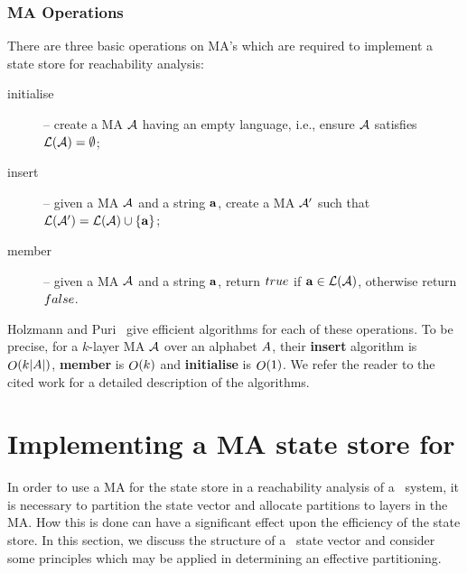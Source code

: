 \subsubsection{MA Operations}
There are three basic operations on MA's which are required to implement 
a state store for reachability analysis: 
\begin{description}
\item[initialise] -- create a MA $\MA$ having an
empty language, i.e., ensure $\MA$ satisfies $\Lang(\MA) = \emptyset$; 
\item[insert] -- given a MA $\MA$ and a string ${\bf a}$, create a
MA $\MA'$ such that $\Lang(\MA') = \Lang(\MA) \cup \{\MAstring\}$;
\item[member] -- given a MA $\MA$ and a string ${\bf a}$, return
  ${true}$ if $\MAstring \in \Lang(\MA)$, otherwise return ${false}$.  
\end{description}
Holzmann and Puri~\cite{hp:99} give efficient algorithms for each of
these operations.  To be precise, for a $k$-layer MA $\MA$ over an
alphabet $A$, their {\bf insert} algorithm is
$\mathop{O}(k{\left|A\right|})$, {\bf member} is $\mathop{O}(k)$ and {\bf
initialise} is $\mathop{O}(1)$.  We refer the reader to the cited work for
a detailed description of the algorithms.
  

\section{Implementing a MA state store for \bcandle\label{sec:sgimpl}}
In order to use a MA for the state store in a reachability analysis of
a \bcandle\ system, it is necessary to partition the state vector and
allocate partitions to layers in the MA. How this is done can have a
significant effect upon the efficiency of the state store. In this
section, we discuss the structure of a \bcandle\ state vector and
consider some principles which may be applied in determining an
effective partitioning.

